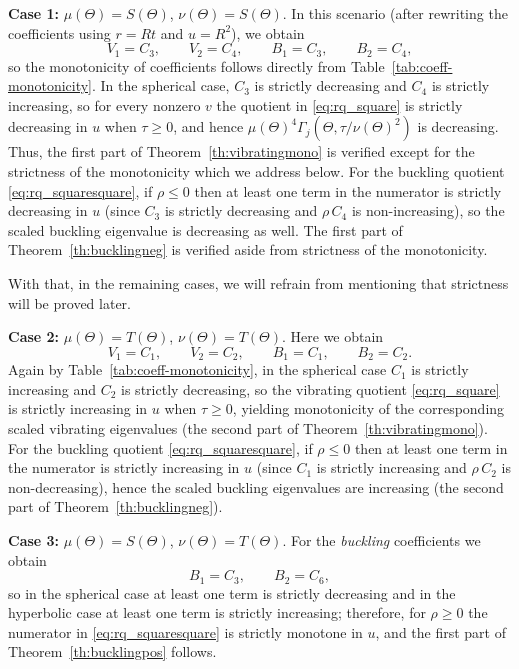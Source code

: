 \documentclass[11pt]{amsart}
\theoremstyle{definition}
\numberwithin{equation}{section}
\begin{document}
\medskip

\noindent\textbf{Case 1:} $\mu(\Theta)=S(\Theta)$, $\nu(\Theta)=S(\Theta)$.  
In this scenario (after rewriting the coefficients using $r=Rt$ and $u=R^2$), we obtain
\[
V_1=C_3,\qquad V_2=C_4,\qquad B_1=C_3,\qquad B_2=C_4,
\]
so the monotonicity of coefficients follows directly from Table~\ref{tab:coeff-monotonicity}.
In the spherical case, $C_3$ is strictly decreasing and $C_4$ is strictly increasing, so for every nonzero $v$ the quotient in \eqref{eq:rq_square} is strictly decreasing in $u$ when $\tau\ge 0$, and hence $\mu(\Theta)^4\Gamma_j(\Theta,\tau/\nu(\Theta)^2)$ is decreasing. Thus, the first part of Theorem~\ref{th:vibratingmono} is verified except for the strictness of the monotonicity which we address below.
For the buckling quotient \eqref{eq:rq_squaresquare}, if $\rho\le 0$ then at least one term in the numerator is strictly decreasing in $u$ (since $C_3$ is strictly decreasing and $\rho\,C_4$ is non-increasing), so the scaled buckling eigenvalue is decreasing as well. The first part of Theorem~\ref{th:bucklingneg} is verified aside from strictness of the monotonicity. 

With that, in the remaining cases, we will refrain from mentioning that strictness will be proved later.

\medskip

\noindent\textbf{Case 2:} $\mu(\Theta)=T(\Theta)$, $\nu(\Theta)=T(\Theta)$.  
Here we obtain
\[
V_1=C_1,\qquad V_2=C_2,\qquad B_1=C_1,\qquad B_2=C_2.
\]
Again by Table~\ref{tab:coeff-monotonicity}, in the spherical case $C_1$ is strictly increasing and $C_2$ is strictly decreasing, so the vibrating quotient \eqref{eq:rq_square} is strictly increasing in $u$ when $\tau\ge 0$, yielding monotonicity of the corresponding scaled vibrating eigenvalues (the second part of Theorem~\ref{th:vibratingmono}).  
For the buckling quotient \eqref{eq:rq_squaresquare}, if $\rho\le 0$ then at least one term in the numerator is strictly increasing in $u$ (since $C_1$ is strictly increasing and $\rho\,C_2$ is non-decreasing), hence the scaled buckling eigenvalues are increasing (the second part of Theorem~\ref{th:bucklingneg}).

\medskip

\noindent\textbf{Case 3:} $\mu(\Theta)=S(\Theta)$, $\nu(\Theta)=T(\Theta)$.  
For the \emph{buckling} coefficients we obtain
\[
B_1=C_3,\qquad B_2=C_6,
\]
so in the spherical case at least one term is strictly decreasing and in the hyperbolic case at least one term is strictly increasing; therefore, for $\rho\ge 0$ the numerator in \eqref{eq:rq_squaresquare} is strictly monotone in $u$, and the first part of Theorem~\ref{th:bucklingpos} follows.
\end{document}
